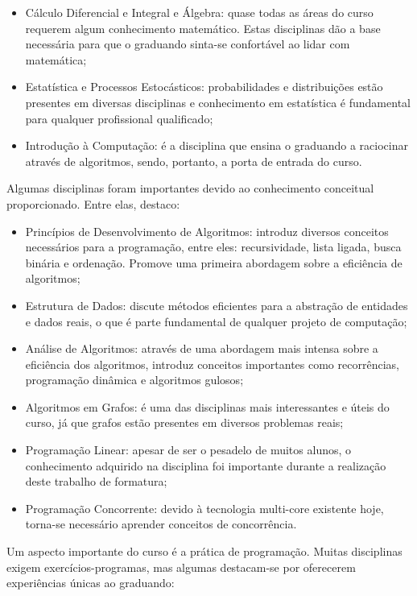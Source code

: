 \begin{itemize}
	\item Cálculo Diferencial e Integral e Álgebra: quase todas as áreas do curso requerem algum
	conhecimento matemático. Estas disciplinas dão a base necessária para que o graduando
	sinta-se confortável ao lidar com matemática;
	\item Estatística e Processos Estocásticos: probabilidades e distribuições estão presentes
	em diversas disciplinas e conhecimento em estatística é fundamental para qualquer
profissional qualificado;
	\item Introdução à Computação: é a disciplina que ensina o graduando a raciocinar através
	de algoritmos, sendo, portanto, a porta de entrada do curso.
\end{itemize}

Algumas disciplinas foram importantes devido ao conhecimento conceitual proporcionado. Entre elas,
destaco:

\begin{itemize}
	\item Princípios de Desenvolvimento de Algoritmos: introduz diversos conceitos necessários
	para a programação, entre eles: recursividade, lista ligada, busca binária e ordenação.
	Promove uma primeira abordagem sobre a eficiência de algoritmos;
	\item Estrutura de Dados: discute métodos eficientes para a abstração de entidades e dados
	reais, 	o que é parte fundamental de qualquer projeto de computação;
	\item Análise de Algoritmos: através de uma abordagem mais intensa sobre a eficiência dos
	algoritmos, introduz conceitos importantes como recorrências, programação dinâmica e
	algoritmos gulosos;
	\item Algoritmos em Grafos: é uma das disciplinas mais interessantes e úteis do curso, já
	que grafos estão presentes em diversos problemas reais;
	\item Programação Linear: apesar de ser o pesadelo de muitos alunos, o conhecimento
	adquirido na disciplina foi importante durante a realização deste trabalho de formatura;
	\item Programação Concorrente: devido à tecnologia multi-core existente hoje, torna-se
	necessário aprender conceitos de concorrência.
\end{itemize}

Um aspecto importante do curso é a prática de programação. Muitas disciplinas exigem
exercícios-programas, mas algumas destacam-se por oferecerem experiências únicas ao graduando:


